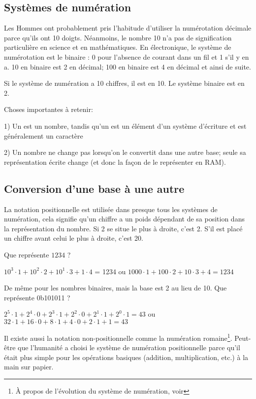﻿\subsection{Systèmes de numération}

Les Hommes ont probablement pris l'habitude d'utiliser la numérotation décimale parce
qu'ils ont 10 doigts. Néanmoins, le nombre 10 n'a pas de signification particulière
en science et en mathématiques. En électronique, le système de numérotation est le
binaire : 0 pour l'absence de courant dans un fil et 1 s'il y en a. 10 en binaire
est 2 en décimal; 100 en binaire est 4 en décimal et ainsi de suite.

Si le système de numération a 10 chiffres, il est en  10. %
Le système binaire est en  2.

Choses importantes à retenir:

1) Un  est un nombre, tandis qu'un  est
un élément d'un système d'écriture et est généralement un caractère

2) Un nombre ne change pas lorsqu'on le convertit dans une autre base; seule sa
représentation écrite change (et donc la façon de le représenter en \ac{RAM}).

\subsection{Conversion d'une base à une autre}

La notation positionnelle est utilisée dans presque tous les systèmes de numération,
cela signifie qu'un chiffre a un poids dépendant de sa position dans la représentation
du nombre. Si 2 se situe le plus à droite, c'est 2. S'il est placé un chiffre avant
celui le plus à droite, c'est 20.

Que représente $1234$ ?

$10^3 \cdot 1 + 10^2 \cdot 2 + 10^1 \cdot 3 + 1 \cdot 4$ = 1234 ou $1000 \cdot 1 +
100 \cdot 2 + 10 \cdot 3 + 4 = 1234$

De même pour les nombres binaires, mais la base est 2 au lieu de 10. Que représente
0b101011 ?

$2^5 \cdot 1 + 2^4 \cdot 0 + 2^3 \cdot 1 + 2^2 \cdot 0 + 2^1 \cdot 1 + 2^0 \cdot 1 =
43$ ou $32 \cdot 1 + 16 \cdot 0 + 8 \cdot 1 + 4 \cdot 0 + 2 \cdot 1 + 1 = 43$

Il existe aussi la notation non-positionnelle comme la numération romaine\footnote{À
propos de l'évolution du système de numération, voir }.
Peut-être que l'humanité a choisi le système de numération positionnelle parce qu'il
était plus simple pour les opérations basiques (addition, multiplication, etc.) à
la main sur papier.

